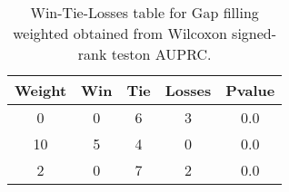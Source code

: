\begin{table}[H]
\centering
\begin{tabular}{|c|c|c|c|c|}

\textbf{Weight} &  \textbf{Win} &  \textbf{Tie} &  \textbf{Losses} &  \textbf{Pvalue} \\
\hline

              0 &             0 &             6 &                3 &              0.0 \\
\hline
             10 &             5 &             4 &                0 &              0.0 \\
\hline
              2 &             0 &             7 &                2 &              0.0 \\
\hline

\end{tabular}
\caption{Win-Tie-Losses table for Gap filling weighted obtained from Wilcoxon signed-rank teston AUPRC.}
\label{tab:gap_filling_weighted_weighted_cae_comparison}
\end{table}